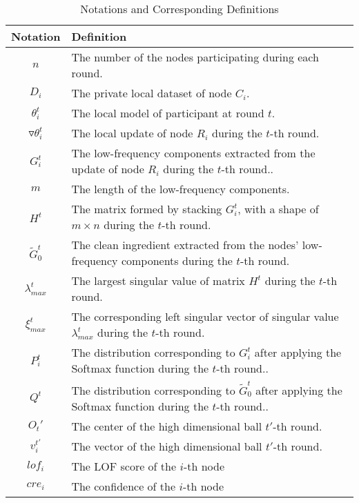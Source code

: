 \documentclass[lettersize,journal]{IEEEtran}
\begin{document}
\begin{table*}[h]
\centering
\caption{Notations and Corresponding Definitions}
\label{tabl:notations}
\begin{tabular}{|c|l|}
\hline
\textbf{Notation} & \textbf{Definition} \\ \hline
$ n $ & The number of the nodes participating during each round. \\ \hline
$D_i$ & The private local dataset of node $C_i$. \\ \hline

$\theta_i^t$ & The local model of participant at round $t$. \\ \hline
$\triangledown \theta_i^t$ & The local update of node $R_i$ during the $t$-th round. \\ \hline
$G_i^t $ & The low-frequency components extracted from the update of node $R_i$ during the $t$-th round.. \\ \hline
$m$ & The length of the low-frequency components. \\ \hline
$H^t$ & The matrix formed by stacking $G_i^t$, with a shape of $m \times n$ during the $t$-th round. \\ \hline
$\tilde{G}_{0}^t $ & The clean ingredient extracted from the nodes' low-frequency components during the $t$-th round. \\ \hline
$\lambda_{max}^t$ & The largest singular value of matrix $H^t$ during the $t$-th round. \\ \hline
$\xi_{max}^t$ & The corresponding left singular vector of singular value $\lambda_{max}^t$ during the $t$-th round. \\ \hline
$P_i^t$ & The distribution corresponding to $G_i^t$ after applying the Softmax function during the $t$-th round.. \\ \hline
$Q^t$ &  The distribution corresponding to $\tilde{G}_{0}^t$ after applying the Softmax function during the $t$-th round.. \\ \hline
$O_t'$ &  The center of the high dimensional ball $t'$-th round. \\ \hline
\( {v}_{i}^{t'} \) & The vector of the high dimensional ball $t'$-th round.\\ \hline
$lof_i$ & The LOF score of the $i$-th node\\ \hline
$cre_i$ & The confidence of the $i$-th node\\ \hline


\end{tabular}
\end{table*}
\end{document}
